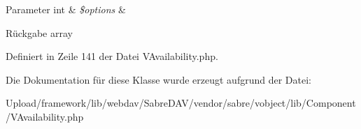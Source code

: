 \begin{DoxyParams}[1]{Parameter}
int & {\em \$options} & \\
\hline
\end{DoxyParams}
\begin{DoxyReturn}{Rückgabe}
array 
\end{DoxyReturn}


Definiert in Zeile 141 der Datei V\+Availability.\+php.



Die Dokumentation für diese Klasse wurde erzeugt aufgrund der Datei\+:\begin{DoxyCompactItemize}
\item 
Upload/framework/lib/webdav/\+Sabre\+D\+A\+V/vendor/sabre/vobject/lib/\+Component/V\+Availability.\+php\end{DoxyCompactItemize}
